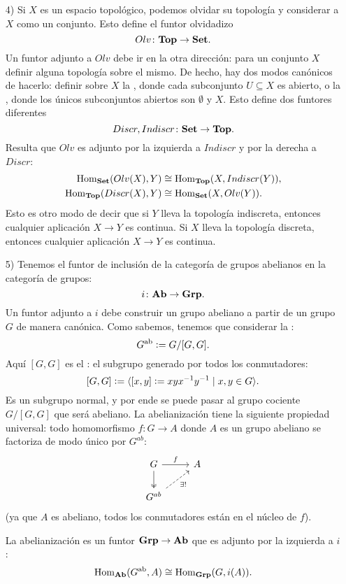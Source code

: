 \documentclass{article}
\numberwithin{equation}{section}
\theoremstyle{definition}
\begin{document}
\begin{ejemplo}
\begin{enumerate}
\item[4)] Si $X$ es un espacio topológico, podemos olvidar su topología y
  considerar a $X$ como un conjunto. Esto define el funtor olvidadizo
  $$Olv\colon \text{\bf Top} \to \text{\bf Set}.$$
  Un funtor adjunto a $Olv$ debe ir en la otra dirección: para un conjunto $X$
  definir alguna topología sobre el mismo. De hecho, hay dos modos canónicos de
  hacerlo: definir sobre $X$ la , donde cada
  subconjunto $U\subseteq X$ es abierto, o la , donde
  los únicos subconjuntos abiertos son $\emptyset$ y $X$. Esto define dos
  funtores diferentes
  $$Discr, Indiscr\colon \text{\bf Set} \to \text{\bf Top}.$$
  Resulta que $Olv$ es adjunto por la izquierda a $Indiscr$ y por la derecha a $Discr$:
  \begin{align*}
    \operatorname{Hom}_{\text{\bf Set}} (Olv (X), Y) & \cong \operatorname{Hom}_{\text{\bf Top}} (X, Indiscr (Y)),\\
    \operatorname{Hom}_{\text{\bf Top}} (Discr (X), Y) & \cong \operatorname{Hom}_{\text{\bf Set}} (X, Olv (Y)).
  \end{align*}
  Esto es otro modo de decir que si $Y$ lleva la topología indiscreta, entonces
  cualquier aplicación $X\to Y$ es continua. Si $X$ lleva la topología discreta,
  entonces cualquier aplicación $X\to Y$ es continua.

\item[5)] Tenemos el funtor de inclusión de la categoría de grupos abelianos en
  la categoría de grupos:
  $$i\colon \text{\bf Ab} \to \text{\bf Grp}.$$
  Un funtor adjunto a $i$ debe construir un grupo abeliano a partir de un grupo
  $G$ de manera canónica. Como sabemos, tenemos que considerar la
  :
  $$G^\mathrm{ab} \mathrel{\mathop:}= G/[G,G].$$
  Aquí $[G,G]$ es el : el subgrupo generado por todos
  los conmutadores:
  $$[G,G] \mathrel{\mathop:}= \langle [x,y] \mathrel{\mathop:}= xyx^{-1}y^{-1} \mid x,y\in G \rangle.$$
  Es un subgrupo normal, y por ende se puede pasar al grupo cociente $G/[G,G]$
  que será abeliano. La abelianización tiene la siguiente propiedad universal:
  todo homomorfismo $f\colon G\to A$ donde $A$ es un grupo abeliano se factoriza
  de modo único por $G^{ab}$:
  \[ \begin{tikzcd}
      G \ar[twoheadrightarrow]{d}\ar{r}{f} & A \\
      G^{ab}\ar[dashed]{ur}[swap]{\exists !}
    \end{tikzcd} \]
  (ya que $A$ es abeliano, todos los conmutadores están en el núcleo de $f$).

  La abelianización es un funtor $\text{\bf Grp} \to \text{\bf Ab}$ que es adjunto por
  la izquierda a $i$:
  $$\operatorname{Hom}_{\text{\bf Ab}} (G^\mathrm{ab}, A) \cong \operatorname{Hom}_{\text{\bf Grp}} (G, i (A)).$$


\end{enumerate}
\end{ejemplo}
\end{document}
